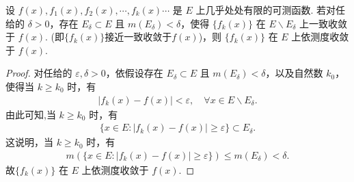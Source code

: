 \documentclass[../../main.tex]{subfiles}%
\begin{document}
\begin{theorem}\label{theorem:定理3.15}
设 $f(x),f_1(x),f_2(x),\cdots,f_k(x)\cdots$ 是 $E$ 上几乎处处有限的可测函数. 若对任给的 $\delta>0$，存在 $E_\delta\subset E$ 且 $m(E_\delta)<\delta$，使得 $\{f_k(x)\}$ 在 $E\backslash E_\delta$ 上一致收敛于 $f(x)$.
(即$\{f_k(x)\}$接近一致收敛于$f(x)$)，则 $\{f_k(x)\}$ 在 $E$ 上依测度收敛于 $f(x)$.
\end{theorem}
\begin{proof}
对任给的 $\varepsilon,\delta>0$，依假设存在 $E_\delta\subset E$ 且 $m(E_\delta)<\delta$，以及自然数 $k_0$，使得当 $k\geqslant k_0$ 时，有
\begin{align*}
\vert f_k(x)-f(x)\vert<\varepsilon,\quad \forall x\in E\backslash E_\delta.
\end{align*}
由此可知,当 $k\geqslant k_0$ 时，有
\begin{align*}
\{x\in E:\vert f_k(x)-f(x)\vert\geqslant\varepsilon\}\subset E_\delta.
\end{align*}
这说明，当 $k\geqslant k_0$ 时，有
\begin{align*}
m(\{x\in E:\vert f_k(x)-f(x)\vert\geqslant\varepsilon\})\leqslant m(E_\delta)<\delta.
\end{align*}
故$\{f_k(x)\}$ 在 $E$ 上依测度收敛于 $f(x)$.
\end{proof}
\end{document}
